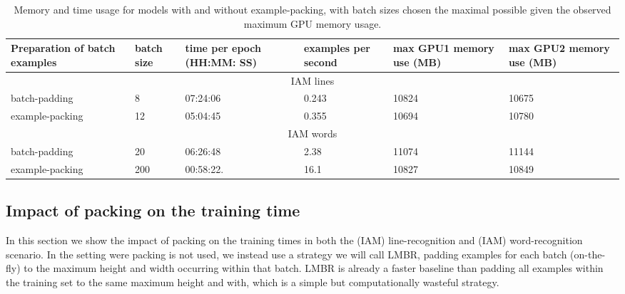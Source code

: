 \documentclass[conference]{IEEEtran}
\renewcommand{\ac}[1]{\gls{#1}}
\begin{document}
\begin{table}
\caption{Memory and time usage for models with and without example-packing, with batch sizes chosen the maximal possible 
given the observed maximum GPU memory usage.} 
\begin{tabular}{|p{2.0cm}| p{0.4cm} |p{1cm}|p{0.9cm}|p{1.1cm}|p{1.1cm}|}
\hline
Preparation of batch examples & batch size & time per epoch (HH:MM: SS)  & examples per second & max GPU1 memory use (MB)   & max GPU2 memory use (MB) \\
\hline
\multicolumn{6}{|c|}{IAM lines} \\
\hline
batch-padding & 8 &  07:24:06 & 0.243 & 10824  & 10675  \\   
\hline
example-packing & 12 &   05:04:45 &  0.355  & 10694  & 10780  \\    
\hline
\multicolumn{6}{|c|}{IAM words} \\
\hline
batch-padding & 20 &  06:26:48 & 2.38 & 11074 & 11144 \\
\hline
example-packing & 200 &   00:58:22. &  16.1  & 10827  & 10849  \\  
\hline
\end{tabular}

\label{table:memory-and-time-usage-with-or-without-packing}
\end{table}

\subsection{Impact of packing on the training time}

In this section we show the impact of packing on the training times in both the (IAM) line-recognition and 
(IAM) word-recognition scenario. In the setting were packing is not used, we instead use a strategy we will call 
\ac{LMBR}, padding examples for each batch (on-the-fly) to the maximum height and width occurring within that batch. 
\ac{LMBR} is already a faster baseline than padding all examples within the training set to the same maximum height and with, which is a simple 
but computationally wasteful strategy.
\end{document}
